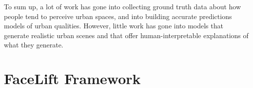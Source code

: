 \mbox{}
To sum up, a lot of work has gone into collecting ground truth data about how people tend to perceive urban spaces, and into building accurate predictions models of urban qualities. However,  little work has gone into models that generate realistic urban scenes and that offer human-interpretable explanations of what they generate. 




\section{FaceLift Framework}
\label{sec:framework}

\begin{table}[t]
\end{table}
